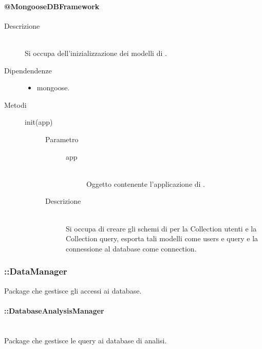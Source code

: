 \paragraph{@MongooseDBFramework}
\begin{description}
 \item[Descrizione] \hfill \\
 Si occupa dell'inizializzazione dei modelli di .
  \item[Dipendendenze] \hfill
  \begin{itemize}
  \item mongoose.
  \end{itemize}
\item[Metodi] \hfill
 \begin{description}
 \item[init(app)] \hfill 
\begin{description}
     		\item[Parametro] \hfill
     			\begin{description}
     				\item[app] \hfill \\
     				Oggetto contenente l'applicazione di .
     			\end{description}
     		\item[Descrizione] \hfill \\
     		  Si occupa di creare gli schemi di  per la Collection utenti e la Collection query, esporta tali modelli come users e query e la connessione al database come connection.
     	\end{description}
 \end{description}
\end{description}

\subsubsection{::DataManager}
Package che gestisce gli accessi ai database.

\paragraph{::DatabaseAnalysisManager} \hfill \\
Package che gestisce le query ai database di analisi. 

